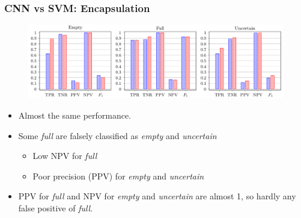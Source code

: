 \documentclass{beamer}
\begin{document}
\begin{frame}
\frametitle{CNN vs SVM: Encapsulation}

\begin{figure}
\centering
\includegraphics[width=\linewidth,height=0.8\textheight,keepaspectratio]{cnn_vs_svm_encapsulation.png} 
\end{figure}

\begin{itemize}
\item Almost the same performance.
\item Some \textit{full} are falsely classified as \textit{empty} and \textit{uncertain}
\begin{itemize}
\item Low NPV for \textit{full}
\item Poor precision (PPV) for \textit{empty} and \textit{uncertain}
\end{itemize}
\item PPV for \textit{full} and NPV for \textit{empty} and \textit{uncertain} are almost 1, so hardly any false positive of \textit{full}.
\end{itemize}

\end{frame}

% 
%
\end{document}
